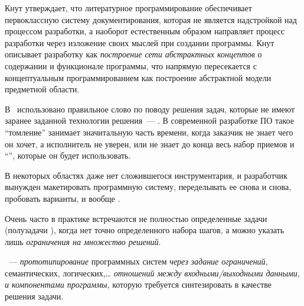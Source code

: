 \label{concept}\secdown

Кнут утверждает, что литературное программирование обеспечивает первоклассную
систему документирования, которая не является надстройкой над процессом
разработки, а наоборот естественным образом направляет процесс разработки через
изложение своих мыслей при создании программы. Кнут описывает разработку как
\emph{построение сети абстрактных концептов} о содержании и функционале
программы, что напрямую пересекается с концептуальным программированием
\cite{tyugu} как построение абстрактной модели предметной области.

В \cite{moskvitin1}\ использовано правильное слово по поводу решения задач,
которые не имеют заранее заданной технологии решения\ --- . В
современной разработке ПО такое ``томление'' занимает значитальную часть
времени, когда заказчик не знает чего он хочет, а исполнитель не уверен, или не
знает до конца весь набор приемов и ``'', которые он будет
использовать.

В некоторых областях даже нет сложившегося инструментария, и разработчик
вынужден макетировать программную систему, переделывать ее снова и снова,
пробовать варианты, и вообще .

Очень часто в практике встречаются не полностью определенные задачи (полузадачи
\cite{moskvitin1}), когда нет точно определенного набора шагов, а можно указать
лишь \emph{ограничения на множество решений}.

\begin{framed}\noindent
{}\ --- \emph{прототипирование} программных
систем \emph{через задание ограничений}, семантических, логических,\ldots
\emph{отношений между входными/выходными данными, и компонентами программы},
которую требуется синтезировать в качестве решения задачи.
\end{framed}



\secup
